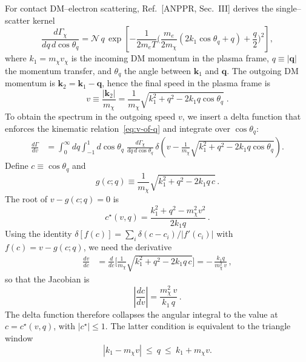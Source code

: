 \documentclass[13.1pt, letterpaper, twoside]{article}
\begin{document}
For contact DM–electron scattering, Ref.~[ANPPR, Sec.~III] derives the single–scatter kernel
\begin{equation}
    \label{eq:anppr-kernel}
    \frac{d\Gamma_\chi}{dq\,d\cos\theta_q}
    =\mathcal N\,q\,
    \exp\!\left[
    -\frac{1}{2m_e T}
    \bigg(\frac{m_e}{2m_\chi}(2k_1\cos\theta_q+q)+\frac{q}{2}\bigg)^{\!2}
    \right],
\end{equation}
where $k_1=m_\chi v_\chi$ is the incoming DM momentum in the plasma frame, $q\equiv|\mathbf q|$ the momentum transfer, and $\theta_q$ the angle between $\mathbf k_1$ and $\mathbf q$. The outgoing DM momentum is $\mathbf k_2=\mathbf k_1-\mathbf q$, hence the final speed in the plasma frame is
\begin{equation*}
    \label{eq:v-of-q}
    v \equiv \frac{|\mathbf k_2|}{m_\chi}
    =\frac{1}{m_\chi}\sqrt{k_1^2+q^2-2k_1 q\cos\theta_q}\;.
\end{equation*}
To obtain the spectrum in the outgoing speed $v$, we insert a delta function that enforces
the kinematic relation~\eqref{eq:v-of-q} and integrate over $\cos\theta_q$:
\begin{align}
    \frac{d\Gamma}{dv}
    &=\int_0^\infty\!dq\!\int_{-1}^{1}\!d\cos\theta_q\;
      \frac{d\Gamma_\chi}{dq\,d\cos\theta_q}\,
      \delta\!\left( v-\frac{1}{m_\chi}\sqrt{k_1^2+q^2-2k_1 q\cos\theta_q}\right).
      \label{eq:proj}
\end{align}
Define $c\equiv\cos\theta_q$ and
\[
   g(c;q)\equiv \frac{1}{m_\chi}\sqrt{k_1^2+q^2-2k_1 q\,c}\, .
\]
The root of $v-g(c;q)=0$ is
\begin{equation*}
    \label{eq:costhstar}
    c^\star(v,q)=\frac{k_1^2+q^2-m_\chi^2 v^2}{2k_1 q}\, .
\end{equation*}
Using the identity $\delta[f(c)]=\sum_i \delta(c-c_i)/|f'(c_i)|$ with $f(c)=v-g(c;q)$,
we need the derivative
\begin{align*}
   \frac{dv}{dc}
   &=\frac{d}{dc}\Big[\tfrac{1}{m_\chi}\sqrt{k_1^2+q^2-2k_1 q\,c}\Big]
     = -\,\frac{k_1 q}{m_\chi^2\,v}\,,
\end{align*}
so that the Jacobian is
\begin{equation*}
   \label{eq:jac}
   \left|\frac{dc}{dv}\right|=\frac{m_\chi^2\,v}{k_1\,q}\,.
\end{equation*}
The delta function therefore collapses the angular integral to the value at $c=c^\star(v,q)$,
with $|c^\star|\le 1$. The latter condition is equivalent to the triangle window
\begin{equation*}
   \label{eq:triangle-window}
   |k_1-m_\chi v|\ \le\ q\ \le\ k_1+m_\chi v .
\end{equation*}
\end{document}
